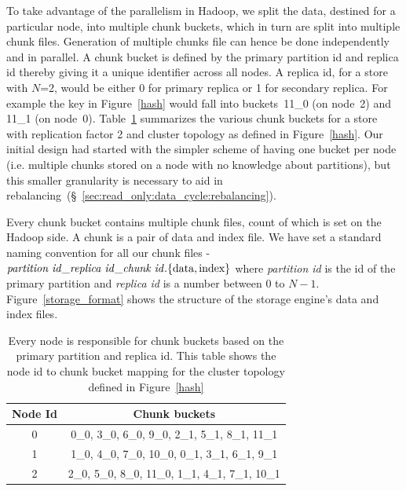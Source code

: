To take advantage of the parallelism in Hadoop, we split the data, 
destined for a particular node, into multiple chunk buckets, 
which in turn are split into multiple chunk files. Generation of 
multiple chunks file can hence be done independently and in parallel. 
A chunk bucket is defined by the primary partition id and replica id 
thereby giving it a unique identifier across all nodes. A replica id,
for a store with $N$=2, would be either 0 for primary replica or 1 for 
secondary replica. For example the key in Figure~\ref{hash} would fall 
into buckets~11\_0 (on node~2) and 11\_1 (on node~0). Table~\ref{tab:node_to_chunk} summarizes the
various chunk buckets for a store with replication factor 2 and cluster
topology as defined in Figure~\ref{hash}. Our initial design 
had started with the simpler scheme of having one bucket per node 
(i.e. multiple chunks stored on a node with no knowledge about partitions), 
but this smaller granularity is necessary to aid in rebalancing~(\S~\ref{sec:read_only:data_cycle:rebalancing}).

Every chunk bucket contains multiple chunk files, count of which is
set on the Hadoop side. A chunk is a pair of data and 
index file. We have set a standard naming convention for all 
our chunk files - 
$\text{\emph{partition id}}\_\text{\emph{replica
id}}\_\text{\emph{chunk id}}.\{\text{data},\text{index}\}$ where
\emph{partition id} is the id of the primary partition and
\emph{replica id} is a number between 0 to $N-1$. 
Figure~\ref{storage_format} shows the structure of the storage
engine's data and index files. 

\begin{table}
\begin{center}
    \begin{tabular}{ | c | c | }
    \hline
    Node Id & Chunk buckets \\ \hline
    0 &  0\_0, 3\_0, 6\_0, 9\_0,      2\_1, 5\_1, 8\_1, 11\_1	\\
   1 &   1\_0, 4\_0, 7\_0, 10\_0,      0\_1, 3\_1, 6\_1, 9\_1		\\
   2 &    2\_0, 5\_0, 8\_0, 11\_0,    1\_1, 4\_1, 7\_1, 10\_1		\\
\hline
    \end{tabular}
\end{center}
 	\caption{Every \projectname{} node is responsible for chunk buckets based on the primary partition and replica id. This table shows the node id to chunk bucket mapping for the cluster topology defined in Figure~\ref{hash}}
 	\label{tab:node_to_chunk}
\end{table}

